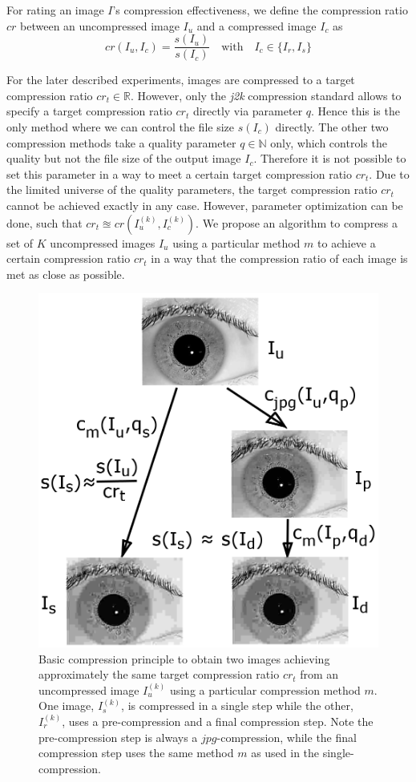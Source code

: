 \documentclass[10pt,twocolumn,letterpaper]{article}
\begin{document}
For rating an image $I$'s compression effectiveness, we define the compression ratio $cr$ between an uncompressed image $I_u$ and a compressed image $I_c$ as 
\begin{equation}
cr(I_u, I_c) = \frac{s(I_u)}{s(I_c)} \quad \text{with} \quad I_c \in \{I_r, I_s\}
\end{equation}

For the later described experiments, images are compressed to a target compression ratio $cr_t \in \mathbb{R}$. However, only the \emph{j2k} compression standard \cite{j2k} allows to specify a target compression ratio $cr_t$ directly via parameter $q$. Hence this is the only method where we can control the file size $s(I_c)$ directly. The other two compression methods take a quality parameter $q \in \mathbb{N}$ only, which controls the quality but not the file size of the output image $I_c$. Therefore it is not possible to set this parameter in a way to meet a certain target compression ratio $cr_t$. Due to the limited universe of the quality parameters, the target compression ratio $cr_t$ cannot be achieved exactly in any case. However, parameter optimization can be done, such that $cr_t \approxeq cr(I_u^{(k)}, I_c^{(k)})$. We propose an algorithm to compress a set of $K$ uncompressed images $I_u$ using a particular method $m$ to achieve a certain compression ratio $cr_t$ in a way that the compression ratio of each image is met as close as possible.


\begin{figure}[h]
	\begin{center}
		
		\includegraphics[width=0.7\linewidth]{img/comprScheme}
	\end{center}
	\caption{Basic compression principle to obtain two images achieving approximately the same target compression ratio $cr_t$ from an uncompressed image $I_u^{(k)}$ using a particular compression method $m$. One image, $I_s^{(k)}$, is compressed in a single step while the other, $I_r^{(k)}$, uses a pre-compression and a final compression step. Note the pre-compression step is always a $jpg$-compression, while the final compression step uses the same method $m$ as used in the single-compression.}
	\label{fig:comprScheme}
	
\end{figure}
\end{document}
